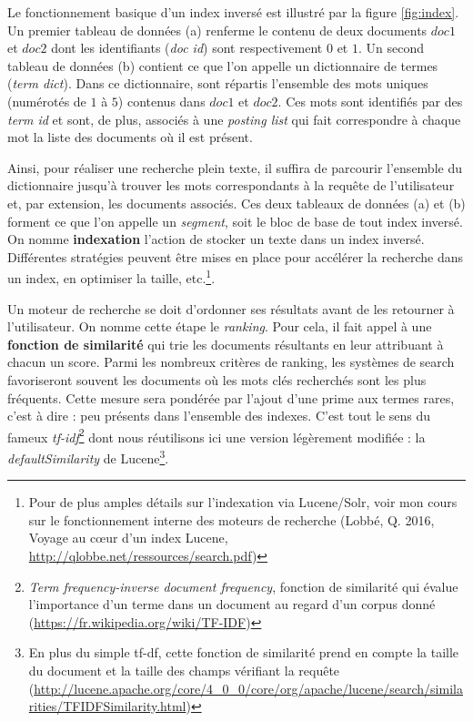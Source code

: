 \documentclass[symmetric,justified,marginals=raggedouter]{tufte-book}
\begin{document}
Le fonctionnement basique d'un index inversé est illustré par la figure \ref{fig:index}. Un premier tableau de données (a) renferme le contenu de deux documents $doc 1$ et $doc 2$ dont les identifiants (\textit{doc id}) sont respectivement $0$ et $1$. Un second tableau de données (b) contient ce que l'on appelle un dictionnaire de termes (\textit{term dict}). Dans ce dictionnaire, sont répartis l'ensemble des mots uniques (numérotés de $1$ à $5$) contenus dans $doc 1$ et $doc 2$. Ces mots sont identifiés par des \textit{term id} et sont, de plus, associés à une \textit{posting list} qui fait correspondre à chaque mot la liste des documents où il est présent. 

Ainsi, pour réaliser une recherche plein texte, il suffira de parcourir l'ensemble du dictionnaire jusqu'à trouver les mots correspondants à la requête de l'utilisateur et, par extension, les documents associés. Ces deux tableaux de données (a) et (b) forment ce que l'on appelle un \textit{segment}, soit le bloc de base de tout index inversé. On nomme \textbf{indexation} l'action de stocker un texte dans un index inversé. Différentes stratégies peuvent être mises en place pour accélérer la recherche dans un index, en optimiser la taille, etc.\footnote{Pour de plus amples détails sur l'indexation via Lucene/Solr, voir mon cours sur le fonctionnement interne des moteurs de recherche (Lobbé, Q. 2016, Voyage au cœur d'un index Lucene, \url{http://qlobbe.net/ressources/search.pdf})}. 

Un moteur de recherche se doit d'ordonner ses résultats avant de les retourner à l'utilisateur. On nomme cette étape le \textit{ranking}. Pour cela, il fait appel à une \textbf{fonction de similarité} qui trie les documents résultants en leur attribuant à chacun un score. Parmi les nombreux critères de ranking, les systèmes de search favoriseront souvent les documents où les mots clés recherchés sont les plus fréquents. Cette mesure sera pondérée par l'ajout d'une prime aux termes rares, c'est à dire : peu présents dans l'ensemble des indexes. C'est tout le sens du fameux \textit{tf-idf}\footnote{\textit{Term frequency-inverse document frequency}, fonction de similarité qui évalue l'importance d'un terme dans un document au regard d'un corpus donné (\url{https://fr.wikipedia.org/wiki/TF-IDF})} dont nous réutilisons ici une version légèrement modifiée : la \textit{defaultSimilarity} de Lucene\footnote{En plus du simple tf-df, cette fonction de similarité prend en compte la taille du document et la taille des champs vérifiant la requête (\url{http://lucene.apache.org/core/4_0_0/core/org/apache/lucene/search/similarities/TFIDFSimilarity.html})}. 
\end{document}
